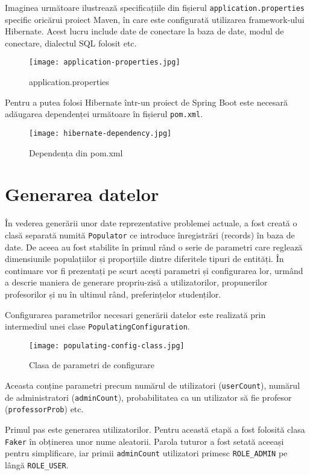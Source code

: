 Imaginea următoare ilustrează specificațiile din fișierul \texttt{application.properties} specific oricărui proiect Maven, în care este configurată utilizarea framework-ului Hibernate. Acest lucru include date de conectare la baza de date, modul de conectare, dialectul SQL folosit etc.

\begin{figure}[H]
	\centering
	\texttt{[image: application-properties.jpg]}
	\caption{application.properties}
\end{figure}

Pentru a putea folosi Hibernate într-un proiect de Spring Boot este necesară adăugarea dependenței următoare în fișierul \texttt{pom.xml}.

\begin{figure}[H]
	\centering
	\texttt{[image: hibernate-dependency.jpg]}
	\caption{Dependența din pom.xml}
\end{figure}

\section{Generarea datelor}

În vederea generării unor date reprezentative problemei actuale, a fost creată o clasă separată numită \texttt{Populator} ce introduce înregistrări (records) în baza de date. De aceea au fost stabilite în primul rând o serie de parametri care reglează dimensiunile populațiilor și proporțiile dintre diferitele tipuri de entități. În continuare vor fi prezentați pe scurt acești parametri și configurarea lor, urmând a descrie maniera de generare propriu-zisă a utilizatorilor, propunerilor profesorilor și nu în ultimul rând, preferințelor studenților.

Configurarea parametrilor necesari generării datelor este realizată prin intermediul unei clase \texttt{PopulatingConfiguration}.

\begin{figure}[H]
	\centering
	\texttt{[image: populating-config-class.jpg]}
	\caption{Clasa de parametri de configurare}
\end{figure}

Aceasta conține parametri precum numărul de utilizatori (\texttt{userCount}), numărul de administratori (\texttt{adminCount}), probabilitatea ca un utilizator să fie profesor 
(\texttt{professorProb}) etc.

Primul pas este generarea utilizatorilor. Pentru această etapă a fost folosită clasa \texttt{Faker} în obținerea unor nume aleatorii. Parola tuturor a fost setată aceeași pentru simplificare, iar primii \texttt{adminCount} utilizatori primesc \texttt{ROLE\_ADMIN} pe lângă \texttt{ROLE\_USER}.

